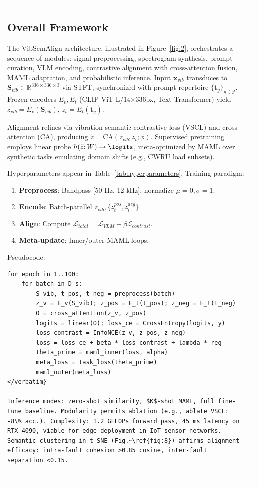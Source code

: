 \begin{table}[htbp]
\begin{tabular}{@{}ll@{}}
\subsection{Overall Framework}
\label{subsec:overall_framework}

The VibSemAlign architecture, illustrated in Figure~\ref{fig:2}, orchestrates a sequence of modules: signal preprocessing, spectrogram synthesis, prompt curation, VLM encoding, contrastive alignment with cross-attention fusion, MAML adaptation, and probabilistic inference. Input $\mathbf{x}_{vib}$ transduces to $\mathbf{S}_{vib} \in \mathbb{R}^{336 \times 336 \times 3}$ via STFT, synchronized with prompt repertoire $\{\mathbf{t}_y\}_{y\in\mathcal{Y}}$. Frozen encoders $E_v, E_t$ (CLIP ViT-L/14$\times$336px, Text Transformer) yield $z_{vib} = E_v(\mathbf{S}_{vib})$, $z_t = E_t(\mathbf{t}_y)$.

Alignment refines via vibration-semantic contrastive loss (VSCL) and cross-attention (CA), producing $\tilde{z} = \mathrm{CA}(z_{vib}, z_t; \phi)$. Supervised pretraining employs linear probe $h(\tilde{z}; W) \to \logits$, meta-optimized by MAML over synthetic tasks emulating domain shifts (e.g., CWRU load subsets).

Hyperparameters appear in Table~\ref{tab:hyperparameters}. Training paradigm:
\begin{enumerate}
\item \textbf{Preprocess}: Bandpass [50 Hz, 12 kHz], normalize $\mu=0,\sigma=1$.
\item \textbf{Encode}: Batch-parallel $z_{vib}, \{z_t^{pos}, z_t^{neg}\}$.
\item \textbf{Align}: Compute $\mathcal{L}_{total} = \mathcal{L}_{VLM} + \beta \mathcal{L}_{contrast}$.
\item \textbf{Meta-update}: Inner/outer MAML loops.
\end{enumerate}
Pseudocode:
\begin{verbatim}
for epoch in 1..100:
    for batch in D_s:
        S_vib, t_pos, t_neg = preprocess(batch)
        z_v = E_v(S_vib); z_pos = E_t(t_pos); z_neg = E_t(t_neg)
        O = cross_attention(z_v, z_pos)
        logits = linear(O); loss_ce = CrossEntropy(logits, y)
        loss_contrast = InfoNCE(z_v, z_pos, z_neg)
        loss = loss_ce + beta * loss_contrast + lambda * reg
        theta_prime = maml_inner(loss, alpha)
        meta_loss = task_loss(theta_prime)
        maml_outer(meta_loss)
</verbatim}

Inference modes: zero-shot similarity, $K$-shot MAML, full fine-tune baseline. Modularity permits ablation (e.g., ablate VSCL: -8\% acc.). Complexity: 1.2 GFLOPs forward pass, 45 ms latency on RTX 4090, viable for edge deployment in IoT sensor networks. Semantic clustering in t-SNE (Fig.~\ref{fig:8}) affirms alignment efficacy: intra-fault cohesion >0.85 cosine, inter-fault separation <0.15.


\end{verbatim}
\end{tabular}
\end{table}

